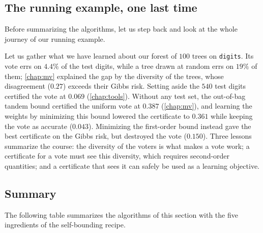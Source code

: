 \subsection{The running example, one last time}

Before summarizing the algorithms, let us step back and look at the whole
journey of our running example.

\begin{running}
Let us gather what we have learned about our forest of $100$ trees on
\texttt{digits}. Its vote errs on $4.4\%$ of the test digits, while a tree drawn
at random errs on $19\%$ of them; \cref{chap:mv} explained the gap by the diversity
of the trees, whose disagreement ($0.27$) exceeds their Gibbs risk. Setting aside
the $540$ test digits certified the vote at $0.069$ (\cref{chap:tools}). Without
any test set, the out-of-bag tandem bound certified the uniform vote at $0.387$
(\cref{chap:mv}), and learning the weights by minimizing this bound lowered the
certificate to $0.361$ while keeping the vote as accurate ($0.043$). Minimizing
the first-order bound instead gave the best certificate on the Gibbs risk, but
destroyed the vote ($0.150$). Three lessons summarize the course: the diversity
of the voters is what makes a vote work; a certificate for a vote must see this
diversity, which requires second-order quantities; and a certificate that sees it
can safely be used as a learning objective.
\end{running}

\subsection{Summary}

The following table summarizes the algorithms of this section with the five
ingredients of the self-bounding recipe.

